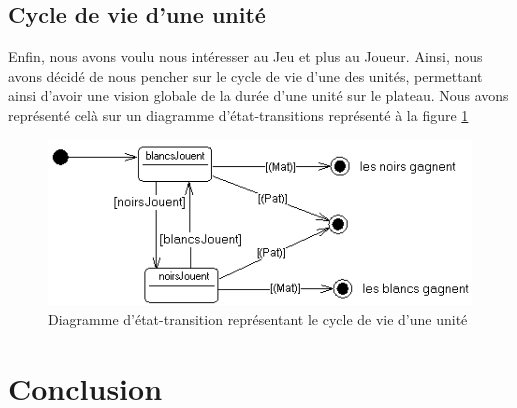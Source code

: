\documentclass[12pt]{article}
\begin{document}
\subsection{Cycle de vie d'une unité}
Enfin, nous avons voulu nous intéresser au Jeu et plus au Joueur. Ainsi, nous avons décidé de nous pencher sur le cycle de vie d'une des unités, permettant ainsi d'avoir une vision globale de la durée d'une unité sur le plateau. Nous avons représenté celà sur un diagramme d'état-transitions représenté à la figure \ref{etata}

\begin{figure}[!h] 
\centerline{\includegraphics[scale=0.60]{img/etata_ex.png}}
   \caption{\label{étiquette} Diagramme d'état-transition représentant le cycle de vie d'une unité}
\label{etata}
\end{figure}
\newpage

\section{Conclusion}

\newpage



\end{document}
